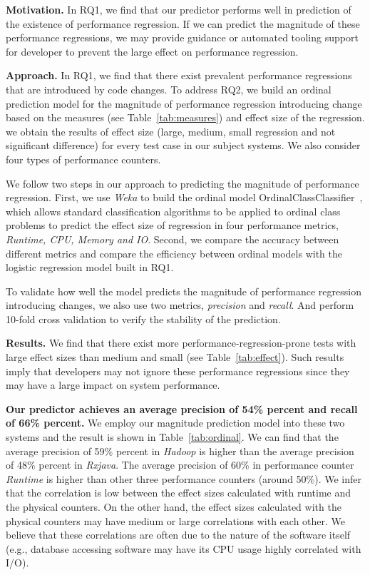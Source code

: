  \textbf{Motivation.}
In RQ1, we find that our predictor performs well in prediction of the existence of performance regression. If we can predict the magnitude of these performance regressions, we may provide guidance or automated tooling support for developer to prevent the large effect on performance regression.

\textbf{Approach.}
In RQ1, we find that there exist prevalent performance regressions that are introduced by code changes. To address RQ2, we build an ordinal prediction model for the magnitude of performance regression introducing change based on the measures (see Table~\ref{tab:measures}) and effect size of the regression. we obtain the results of effect size (large, medium, small regression and not significant difference) for every test case in our subject systems. We also consider four types of performance counters.

We follow two steps in our approach to predicting the magnitude of performance regression. First, we use \emph{Weka} to build the ordinal model OrdinalClassClassifier~\cite{Frank2001}, which allows standard classification algorithms to be applied to ordinal class problems to predict the effect size of regression in four performance metrics, \emph{Runtime, CPU, Memory and IO}. Second, we compare the accuracy between different metrics and compare the efficiency between ordinal models with the logistic regression model built in RQ1. 

To validate how well the model predicts the magnitude of performance regression introducing changes, we also use two metrics, \emph{precision} and \emph{recall}. And perform 10-fold cross validation to verify the stability of the prediction.

\textbf{Results.} We find that there exist more performance-regression-prone tests with large effect sizes than medium and small (see Table~\ref{tab:effect}). Such results imply that developers may not ignore these performance regressions since they may have a large impact on system performance.

\textbf{Our predictor achieves an average precision of 54\% percent and recall of 66\% percent.} We employ our magnitude prediction model into these two systems and the result is shown in Table~\ref{tab:ordinal}. We can find that the average precision of 59\% percent in \emph{Hadoop} is higher than the average precision of 48\% percent in \emph{Rxjava}. The average precision of 60\% in performance counter \emph{Runtime} is higher than other three performance counters (around 50\%).  We infer that the correlation is low between the effect sizes calculated with runtime and the physical counters. On the other hand, the effect sizes calculated with the physical counters may have medium or large correlations with each other. We believe that these correlations are often due to the nature of the software itself (e.g., database accessing software may have its CPU usage highly correlated with I/O).

